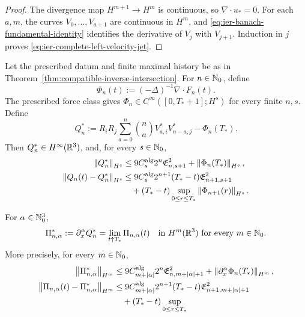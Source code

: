 \begin{proof}
The divergence map \(H^{m+1}\to H^m\) is continuous, so
\(\nabla\cdot u_*=0\).  For each \(a,m\), the curves
\(V_0,\ldots,V_{a+1}\) are continuous in \(H^m\), and
\eqref{eq:ier-banach-fundamental-identity} identifies the derivative of
\(V_j\) with \(V_{j+1}\).  Induction in \(j\) proves
\eqref{eq:ier-complete-left-velocity-jet}.
\end{proof}

\begin{theorem}
\label{thm:ier-pressure-complete-endpoint}
\begin{samepage}
Let the prescribed datum and finite maximal history be as in
Theorem~\ref{thm:compatible-inverse-intersection}.
For \(n\in\mathbb N_0\), define
\[
 \Phi_n(t):=(-\Delta)^{-1}\nabla\cdot F_n(t).
\]
The prescribed force class gives
\(\Phi_n\in C^\infty([0,T_*+1];H^s)\) for every finite \(n,s\).  Define
\begin{equation}
 Q_n^*:=R_iR_j\sum_{a=0}^{n}\binom na
 V_{a,i}^*V_{n-a,j}^*-\Phi_n(T_*).
 \label{eq:ier-terminal-pressure-row}
\end{equation}
Then \(Q_n^*\in H^\infty(\mathbb R^3)\), and, for every \(s\in\mathbb N_0\),
\begin{align}
 \left\lVert Q_n^*\right\rVert_{H^s}
 &\le9C_s^{\rm alg}2^n\mathfrak E_{n,s+1}^2
 +\left\lVert \Phi_n(T_*)\right\rVert_{H^s},
 \label{eq:ier-terminal-pressure-size}\\
 \left\lVert Q_n(t)-Q_n^*\right\rVert_{H^s}
 &\le9C_s^{\rm alg}2^{n+1}(T_*-t)\mathfrak E_{n+1,s+1}^2\\
 &\quad +(T_*-t)
 \sup_{0\le r\le T_*}\left\lVert \Phi_{n+1}(r)\right\rVert_{H^s}.
 \label{eq:ier-terminal-pressure-modulus}
\end{align}
\end{samepage}
For \(\alpha\in\mathbb N_0^3\),
\begin{equation}
 \Pi_{n,\alpha}^*:=\partial_x^\alpha Q_n^*
 =\lim_{t\uparrow T_*}\Pi_{n,\alpha}(t)
 \quad\text{in }H^m(\mathbb R^3)\text{ for every }m\in\mathbb N_0.
 \label{eq:ier-terminal-mixed-pressure-row}
\end{equation}
More precisely, for every \(m\in\mathbb N_0\),
\begin{align}
 \norm{\Pi_{n,\alpha}^*}_{H^m}
 &\le9C_{m+|\alpha|}^{\rm alg}2^n
 \mathfrak E_{n,m+|\alpha|+1}^2
 +\norm{\partial_x^\alpha\Phi_n(T_*)}_{H^m},
 \label{eq:ier-terminal-mixed-pressure-size}\\
 \norm{\Pi_{n,\alpha}(t)-\Pi_{n,\alpha}^*}_{H^m}
 &\le9C_{m+|\alpha|}^{\rm alg}2^{n+1}(T_*-t)
 \mathfrak E_{n+1,m+|\alpha|+1}^2\\
 &\quad +(T_*-t)\sup_{0\le r\le T_*}

\end{align}
\end{theorem}
